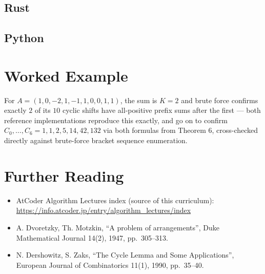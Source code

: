 \documentclass[11pt]{article}
\begin{document}
\codenote
\subsection{Rust}

\subsection{Python}

\section{Worked Example}
\begin{examplebox}
For $A=(1,0,-2,1,-1,1,0,0,1,1)$, the sum is $K=2$ and brute force confirms
exactly $2$ of its $10$ cyclic shifts have all-positive prefix sums after
the first --- both reference implementations reproduce this exactly, and
go on to confirm $C_0,\ldots,C_6 = 1,1,2,5,14,42,132$ via both formulas
from Theorem 6, cross-checked directly against brute-force bracket
sequence enumeration.
\end{examplebox}

\section{Further Reading}
\begin{itemize}[leftmargin=1.5em]
  \item AtCoder Algorithm Lectures index (source of this curriculum):
        \url{https://info.atcoder.jp/entry/algorithm_lectures/index}
  \item A. Dvoretzky, Th. Motzkin, ``A problem of arrangements'', Duke
        Mathematical Journal 14(2), 1947, pp.\ 305--313.
  \item N. Dershowitz, S. Zaks, ``The Cycle Lemma and Some
        Applications'', European Journal of Combinatorics 11(1), 1990,
        pp.\ 35--40.
\end{itemize}
\end{document}
